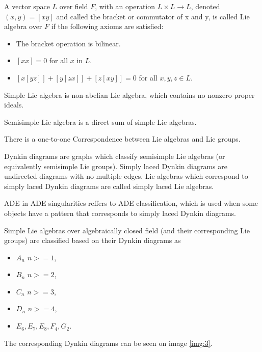 \begin{definition} \cite{humphreys2012introduction}
    A vector space $L$ over field $F$, with an operation $L \times L \to L$,
    denoted $(x, y) = [xy]$ and called the bracket or commutator of x and y,
    is called Lie algebra over $F$ if the following axioms are satisfied:
    \begin{itemize}
        \item The bracket operation is bilinear.
        \item $[xx] = 0$ for all $x$ in $L$.
        \item $[x[yz]]+[y[zx]]+[z[xy]] = 0$ for all $x, y, z \in L$.
    \end{itemize}

    Simple Lie algebra is non-abelian Lie algebra, which contains no
    nonzero proper ideals.

    Semisimple Lie algebra is a direct sum of simple Lie algebras.
\end{definition}

There is a one-to-one Correspondence between Lie algebras and Lie groups.

Dynkin diagrams are graphs which classify semisimple Lie algebras (or
equivalently semisimple Lie groups).
Simply laced Dynkin diagrams are undirected diagrams with
no multiple edges. Lie algebras which correspond to simply laced
Dynkin diagrams are called simply laced Lie algebras.

ADE in ADE singularities reffers to ADE classification, which is used when
some objects have a pattern that corresponds to simply laced Dynkin diagrams.

Simple Lie algebras over algebraically closed field 
(and their corresponding Lie groups) are
classified based on their Dynkin diagrams as
\begin{itemize}
\item $A_n$ \hspace{3mm}  $n>=1$,
\item $B_n$ \hspace{3mm}  $n>=2$,
\item $C_n$ \hspace{3mm}  $n>=3$,
\item $D_n$ \hspace{3mm}  $n>=4$,
\item $E_6, E_7, E_8, F_4, G_2$.
\end{itemize}
The corresponding Dynkin diagrams can be seen on image \ref{img:3}.

